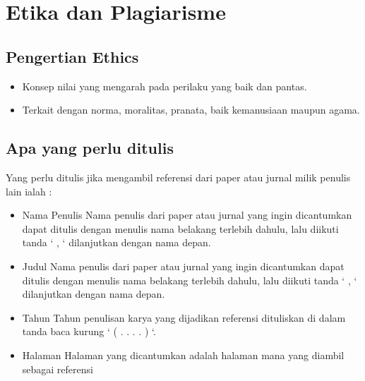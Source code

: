 \section{Etika dan Plagiarisme}

\subsection{Pengertian Ethics}
\begin{itemize}
    \item Konsep nilai yang mengarah pada perilaku yang baik dan pantas.
    \item Terkait dengan norma, moralitas, pranata, baik kemanusiaan maupun agama.
\end{itemize}

\subsection{Apa yang perlu ditulis}
Yang perlu ditulis jika mengambil referensi dari paper atau jurnal milik penulis lain ialah :
\begin{itemize}
  \item Nama Penulis
   \newline Nama penulis dari paper atau jurnal yang ingin dicantumkan dapat ditulis dengan menulis nama belakang terlebih dahulu, lalu diikuti tanda ‘ , ‘ dilanjutkan dengan nama depan.
  \item Judul
  \newline Nama penulis dari paper atau jurnal yang ingin dicantumkan dapat ditulis dengan menulis nama belakang terlebih dahulu, lalu diikuti tanda ‘ , ‘ dilanjutkan dengan nama depan.
  \item Tahun
  \newline Tahun penulisan karya yang dijadikan referensi dituliskan di dalam tanda baca kurung ‘ ( . . . . ) ‘.
  \item Halaman
  \newline Halaman yang dicantumkan adalah halaman mana yang diambil sebagai referensi
\end{itemize}

